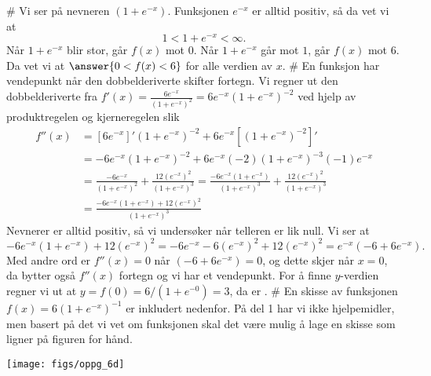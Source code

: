 \begin{easylist}[enumerate]
	# Vi ser på nevneren $(1 + e^{-x})$.
	Funksjonen $e^{-x}$ er alltid positiv, så da vet vi at
	\begin{equation*}
		1 < 1 + e^{-x} < \infty.
	\end{equation*}
	Når $1 + e^{-x}$ blir stor, går $f(x)$ mot $0$.
	Når $1 + e^{-x}$ går mot $1$, går $f(x)$ mot $6$.
	Da vet vi at $\answer{0 < f(x) < 6}$ for alle verdien av $x$.
	# En funksjon har vendepunkt når den dobbelderiverte skifter fortegn.
	Vi regner ut den dobbelderiverte fra $f'(x) = \frac{6e^{-x}}{\left(1 + e^{-x}\right)^2} = 6e^{-x} \left(1 + e^{-x}\right)^{-2} $ ved hjelp av produktregelen og kjerneregelen slik
	\begin{align*}
		f''(x) &= \left[ 6e^{-x} \right]' \left(1 + e^{-x}\right)^{-2} + 6e^{-x} \left[ \left(1 + e^{-x}\right)^{-2} \right]' \\
		&=  -6e^{-x}  \left(1 + e^{-x}\right)^{-2} + 6e^{-x} (-2)  \left(1 + e^{-x}\right)^{-3} (-1) e^{-x}  \\
		&=  \frac{-6e^{-x}}{\left(1 + e^{-x}\right)^{2}}  + \frac{12\left(e^{-x}\right)^2}{\left(1 + e^{-x}\right)^{3}} =
		 \frac{-6e^{-x} \left(1 + e^{-x}\right)}{\left(1 + e^{-x}\right)^{3}} 
		  + \frac{12\left(e^{-x}\right)^2}{\left(1 + e^{-x}\right)^{3}}\\
		 &=  \frac{-6e^{-x} \left(1 + e^{-x}\right) + 12\left(e^{-x}\right)^2}{\left(1 + e^{-x}\right)^{3}}
	\end{align*}
	Nevnerer er alltid positiv, så vi undersøker når telleren er lik null.
	Vi ser at
	\begin{equation*}
		-6e^{-x} \left(1 + e^{-x}\right) + 12\left(e^{-x}\right)^2 = 
		-6e^{-x} - 6\left(e^{-x}\right)^2 + 12\left(e^{-x}\right)^2 = 
		e^{-x} \left(-6 + 6 e^{-x}\right).
	\end{equation*}
	Med andre ord er $f''(x) = 0$ når $\left(-6 + 6 e^{-x}\right) = 0$,
	og dette skjer når $x = 0$, da bytter også $f''(x)$ fortegn og vi har et vendepunkt.
	For å finne $y$-verdien regner vi ut at $y = f(0) = 6 / (1 + e^{-0}) = 3$,
	da er .
	# En skisse av funksjonen $f(x) = 6 \left( 1 + e^{-x} \right)^{-1}$ er inkludert nedenfor. 
	På del 1 har vi ikke hjelpemidler, men basert på det vi vet om funksjonen skal det være mulig å lage en skisse som ligner på figuren for hånd.
	\begin{center}
		\texttt{[image: figs/oppg\_6d]}
	\end{center}
\end{easylist}

